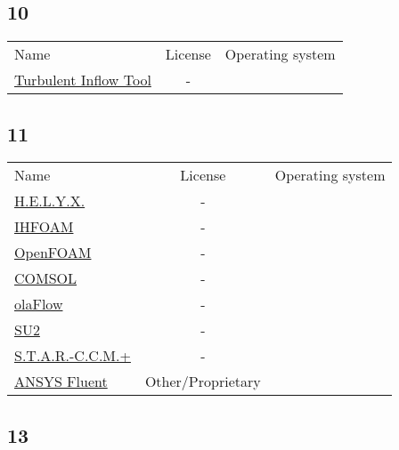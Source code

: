 \subsection{10}

\begin{table}[]
    \centering
    \begin{tabular}{l|cc}
    \toprule
    Name &  License & Operating system\\ 
        \href{https://doi.org/10.5281/zenodo.3462804}{Turbulent Inflow Tool} & - &\\ 
    \bottomrule
    \end{tabular}
\end{table}

\subsection{11}

\begin{table}[]
    \centering
    \begin{tabular}{l|cc}
    \toprule
    Name &  License & Operating system\\ 
        \href{https://engys.com/.}{H.E.L.Y.X.} & - &\\
        \href{https://ihfoam.ihcantabria.com/.}{IHFOAM} & - &\\
        \href{https://openfoam.org.}{OpenFOAM} & - &\\
        \href{https://www.comsol.com.}{COMSOL} & - &\\
        \href{olaflow.github.io}{olaFlow} & - &\\
        \href{https://su2code.github.io/.}{SU2} & - &\\
        \href{https://mdx.plm.automation.siemens.com/star-ccm-plus.}{S.T.A.R.-C.C.M.+} & - &\\
        \href{https://www.ansys.com/products/fluids/ansys-fluent.}{ANSYS Fluent} &  Other/Proprietary  &\\ 
    \bottomrule
    \end{tabular}
\end{table}

\subsection{13}

